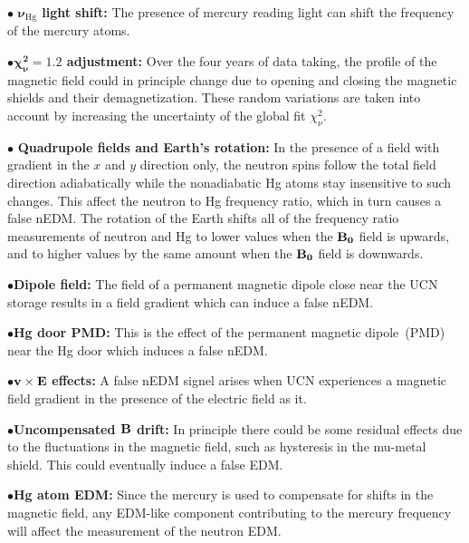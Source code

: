 \begin{description}
\item{ $\bullet$ \bf{$\boldsymbol{\nu_{\mathrm{Hg}}}$ light shift:}}
  The presence of mercury reading light can shift the frequency of the
  mercury atoms.
  
\item{$\bullet$\bf{$\boldsymbol{\chi_{\nu}^2 = 1.2}$ adjustment:}}
  Over the four years of data taking, the profile of the magnetic
  field could in principle change due to opening and closing the
  magnetic shields and their demagnetization. These random variations
  are taken into account by increasing the uncertainty of the global
  fit $\chi^2_{\nu}$.
  
\item{$\bullet$ \bf{Quadrupole fields and Earth's rotation:}} In the
  presence of a field with gradient in the $x$ and $y$ direction only,
  the neutron spins follow the total field direction adiabatically
  while the nonadiabatic Hg atoms stay insensitive to such
  changes. This affect the neutron to Hg frequency ratio, which in
  turn causes a false nEDM. The rotation of the Earth shifts all of
  the frequency ratio measurements of neutron and Hg to lower values
  when the $\bf{B_0}$ field is upwards, and to higher values by the
  same amount when the $\bf{B_0}$ field is downwards.
  
\item{$\bullet$\bf{Dipole field:}} The field of a permanent magnetic
  dipole close near the UCN storage results in a field gradient which
  can induce a false nEDM.

\item{$\bullet$\bf{Hg door PMD:}} This is the effect of the permanent
  magnetic dipole~(PMD) near the Hg door which induces a false nEDM.
  
\item{$\bullet$$\bf{v}\times\bf{E}$ \bf{effects}:} A false nEDM signel
  arises when UCN experiences a magnetic field gradient in the
  presence of the electric field as it.

\item{$\bullet$\bf{Uncompensated
      $\bf{B}$ drift:}} In principle there could be some residual
  effects due to the fluctuations in the magnetic field, such as
  hysteresis in the mu-metal shield. This could eventually induce a
  false EDM.

\item{$\bullet$\bf{Hg atom EDM:}} Since the mercury is used to
  compensate for shifts in the magnetic field, any EDM-like component
  contributing to the mercury frequency will affect the measurement of
  the neutron EDM.


\end{description}
